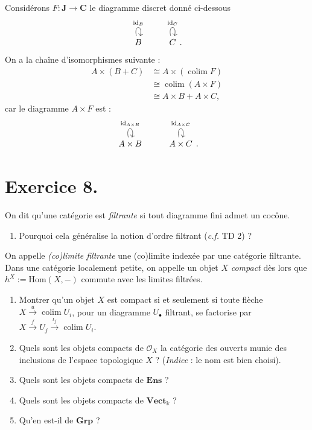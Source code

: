 \documentclass{../../td}
\begin{document}
\begin{enumerate}
      Considérons $F : \mathbf{J} \to \mathbf{C}$ le diagramme discret  donné ci-dessous \[
      \begin{tikzcd}
        B\arrow[loop above]{}{\mathrm{id}_B} & 
        C\arrow[loop above]{}{\mathrm{id}_C}
      \end{tikzcd}
      .\]
      On a la chaîne d'isomorphismes suivante :
      \begin{align*}
        A \times (B + C) &\cong A \times (\operatorname{colim} F)\\
        &\cong \operatorname{colim} (A \times F)\\
        &\cong A \times B + A \times C
      ,\end{align*}
      car le diagramme $A \times F$ est :\[
      \begin{tikzcd}
        A \times B\arrow[loop above]{}{\mathrm{id}_{A \times B}} & 
        A \times C\arrow[loop above]{}{\mathrm{id}_{A \times C}}
      \end{tikzcd}
      .\]
  \end{enumerate}

  \chapter{Exercice 8.}

  \begin{slshape}
    \color{deepblue}
    On dit qu'une catégorie est \textit{filtrante} si tout diagramme fini admet un cocône.

    \begin{enumerate}
      \item Pourquoi cela généralise la notion d'ordre filtrant (\textit{c.f.} TD 2) ?
    \end{enumerate}
    On appelle \textit{(co)limite filtrante} une (co)limite indexée par une catégorie filtrante.
    Dans une catégorie localement petite, on appelle un objet $X$ \textit{compact} dès lors que $h^X := \mathrm{Hom}(X, -)$ commute avec les limites filtrées.

    \begin{enumerate}[resume*]
      \item Montrer qu'un objet $X$ est compact si et seulement si toute flèche $X \overset u \to \operatorname{colim} U_i$, pour un diagramme $U_\bullet$ filtrant, se factorise par  $X \overset f \to U_j \overset {\iota_j} \to \operatorname{colim} U_i$. \label{ex8-q2}
      \item Quels sont les objets compacts de $\mathcal{O}_X$ la catégorie des ouverts munie des inclusions de l'espace topologique $X$ ? (\textit{Indice} : le nom est bien choisi).
      \item Quels sont les objets compacts de $\mathbf{Ens}$ ?
      \item Quels sont les objets compacts de $\mathbf{Vect}_\mathds{k}$ ?
      \item Qu'en est-il de $\mathbf{Grp}$ ?
    \end{enumerate}
  \end{slshape}
\end{document}
